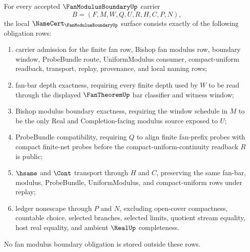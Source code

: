 \begin{theorem}
\label{thm:fan-modulus-boundary-namecert-obligations}
For every accepted $\FanModulusBoundaryUp$ carrier
$$
B=(F,M,W,Q,U,R,H,C,P,N),
$$
the local $\NameCert_{\FanModulusBoundaryUp}$ surface consists exactly of the following obligation rows:
\begin{enumerate}
\item carrier admission for the finite fan row, Bishop fan modulus row, boundary window, ProbeBundle route, UniformModulus consumer, compact-uniform readback, transport, replay, provenance, and local naming rows;
\item fan-bar depth exactness, requiring every finite depth used by $W$ to be read through the displayed $\FanTheoremUp$ bar classifier and witness window;
\item Bishop modulus boundary exactness, requiring the window schedule in $M$ to be the only Real and Completion-facing modulus source exposed to $U$;
\item ProbeBundle compatibility, requiring $Q$ to align finite fan-prefix probes with compact finite-net probes before the compact-uniform-continuity readback $R$ is public;
\item $\hsame$ and $\Cont$ transport through $H$ and $C$, preserving the same fan-bar, modulus, ProbeBundle, UniformModulus, and compact-uniform rows under replay;
\item ledger nonescape through $P$ and $N$, excluding open-cover compactness, countable choice, selected branches, selected limits, quotient stream equality, host real equality, and ambient $\RealUp$ completeness.
\end{enumerate}
No fan modulus boundary obligation is stored outside these rows.
\end{theorem}


\begin{closurestatus}{\FanModulusBoundaryUp}
  \theoryclosure{\seedClosure}
  \formalstatus{\unformalizedV}
\end{closurestatus}
